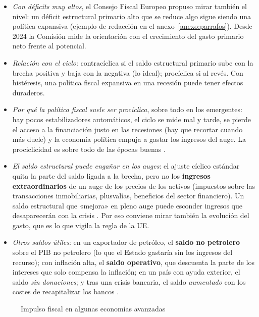 \documentclass[11pt]{article}
\begin{document}
\begin{itemize}
\item \emph{Con déficits muy altos}, el Consejo Fiscal Europeo propuso mirar también el nivel: un déficit estructural primario alto que se reduce algo sigue siendo una política expansiva \parencite{EFB2021FiscalStance} (ejemplo de redacción en el anexo~\ref{anexo:parrafos}). Desde 2024 la Comisión mide la orientación con el crecimiento del gasto primario neto frente al potencial.
\item \emph{Relación con el ciclo}: contracíclica si el saldo estructural primario sube con la brecha positiva y baja con la negativa (lo ideal); procíclica si al revés. Con histéresis, una política fiscal expansiva en una recesión puede tener efectos duraderos.
\item \emph{Por qué la política fiscal suele ser procíclica}, sobre todo en los emergentes: hay pocos estabilizadores automáticos, el ciclo se mide mal y tarde, se pierde el acceso a la financiación justo en las recesiones (hay que recortar cuando más duele) y la economía política empuja a gastar los ingresos del auge. La prociclicidad es sobre todo de las épocas buenas \parencite{Kaminsky2004Rains,FMI2013CaseStudy}.
\item \emph{El saldo estructural puede engañar en los auges}: el ajuste cíclico estándar quita la parte del saldo ligada a la brecha, pero no los \textbf{ingresos extraordinarios} de un auge de los precios de los activos (impuestos sobre las transacciones inmobiliarias, plusvalías, beneficios del sector financiero). Un saldo estructural que «mejora» en pleno auge puede esconder ingresos que desaparecerán con la crisis \parencite{MorrisSchuknecht2007}. Por eso conviene mirar también la evolución del gasto, que es lo que vigila la regla de la UE.
\item \emph{Otros saldos útiles}: en un exportador de petróleo, el \textbf{saldo no petrolero} sobre el PIB no petrolero (lo que el Estado gastaría sin los ingresos del recurso); con inflación alta, el \textbf{saldo operativo}, que descuenta la parte de los intereses que solo compensa la inflación; en un país con ayuda exterior, el saldo \emph{sin donaciones}; y tras una crisis bancaria, el saldo \emph{aumentado} con los costes de recapitalizar los bancos \parencite{FMI2013CaseStudy}.
\end{itemize}

\begin{figure}[!htb]
\centering
\caption{Impulso fiscal en algunas economías avanzadas}\label{fig:impulso-fiscal}
\end{figure}
\end{document}
